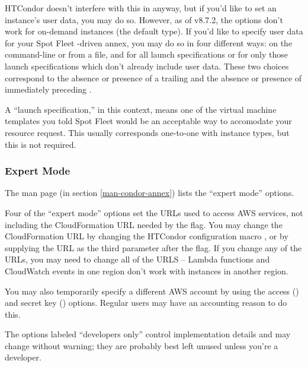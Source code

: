 HTCondor doesn't interfere with this in anyway, but if you'd like to set
an instance's user data, you may do so.  However, as of v8.7.2, the
 options don't work for on-demand instances (the default
type).  If you'd like to specify user data for your Spot Fleet -driven
annex, you may do so in four different ways: on the command-line or
from a file, and for all launch specifications or for only those launch
specifications which don't already include user data.  These two choices
correspond to the absence or presence of a trailing  and the
absence or presence of  immediately preceding .

A ``launch specification,'' in this context, means one of the virtual machine
templates you told Spot Fleet would be an acceptable way to accomodate your
resource request.  This usually corresponds one-to-one with instance types,
but this is not required.

\subsubsection{Expert Mode}

The man page (in section \ref{man-condor-annex}) lists the ``expert
mode'' options.

Four of the ``expert mode'' options set the URLs used to access AWS services,
not including the CloudFormation URL needed by the  flag.  You
may change the CloudFormation URL by changing the HTCondor configuration
macro , or by supplying the URL as the third
parameter after the  flag.  If you change any of the URLs,
you may need to change all of the URLS -- Lambda functions and CloudWatch
events in one region don't work with instances in another region.

You may also temporarily specify a different AWS account by using the
access () and
secret key () options.  Regular users may have
an accounting reason to do this.

The options labeled ``developers only'' control implementation details and
may change without warning; they are probably best left unused unless you're
a developer.

